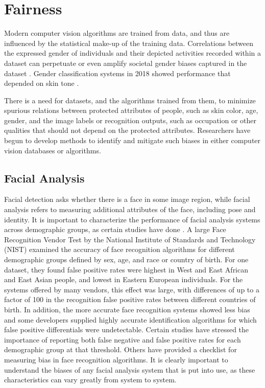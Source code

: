 \section{Fairness}
\label{sect:fairness}

Modern computer vision algorithms are trained from data, and thus are
influenced by the statistical make-up of the training data.
Correlations between the expressed gender of
individuals and their depicted activities recorded within a dataset 
can perpetuate or even amplify societal gender biases captured in the dataset \cite{Zhao2017,dalessandro2017,Noble2018}.  Gender classification systems in 2018 showed performance that depended on skin tone \cite{Buolamwini2018}.


There is a need for datasets, and the algorithms trained from them, to minimize spurious relations between protected attributes of people, such as skin color, age, gender, and the image labels or recognition outputs, such as occupation or other qualities that should not depend on the protected attributes.
Researchers have begun to develop methods to identify and mitigate such biases in either computer vision databases or algorithms.

\subsection{Facial Analysis}

Facial detection asks whether there is a face in some image region, while facial analysis refers to measuring additional attributes of the face, including pose and identity.  It is important to characterize the performance of facial analysis systems across demographic groups, as certain studies have done \cite{Klare2012}.  A large Face Recognition Vendor Test by the National Institute of Standards and Technology (NIST) \cite{Grother2019}  examined the accuracy of face recognition algorithms for different demographic groups defined by sex, age, and race or country of birth. For one dataset, they found
 false positive rates were highest in West and East African and East Asian people, and lowest in Eastern European individuals. For the systems offered by many vendors, this effect was large, with differences of up to a factor of 100 in the recognition false positive rates between different countries of birth. In addition, the more accurate face recognition systems showed less bias and
some developers supplied highly accurate identification algorithms for
which false positive differentials were undetectable.
 Certain studies \cite{Grother2019} have stressed the importance of reporting both false negative and false positive rates for each
demographic group at that threshold. Others \cite{Cavazos2021} have provided
 a checklist for measuring bias in face recognition algorithms.  It is clearly important to understand the biases of any facial analysis system that is put into use, as these characteristics can vary greatly from system to system.

